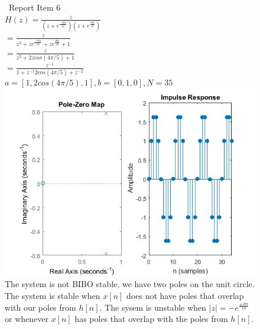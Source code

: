 \documentclass{article}
\begin{document}
\begin{figure}[H]
\ Report Item 6
\\ $H(z) = \frac{z}{{(z+e^{\frac{-i8\pi}{10}})(z+e^{\frac{i8\pi}{10}})}}$
\\ $ = \frac{z}{z^2 + ze^{\frac{-i8\pi}{10}} + ze^{\frac{i8\pi}{10}} + 1}$
\\ $ = \frac{z}{z^2+2zcos(4\pi/5) + 1}$
\\ $ = \frac{z^{-1}}{1 + z^{-1}2cos(4\pi/5) + z^{-2}}$
\\ $ a = [1,2cos(4\pi/5),1], b = [0,1,0], N = 35$
\includegraphics[scale = .5]{report6}
\\ The system is not BIBO stable, we have two poles on the unit circle.  The system is stable when $x[n]$ does not have poles that overlap with our poles from $h[n]$. The sysem is unstable when $|z| =  - e^{\frac{\pm i8\pi}{10}}$ or whenever $x[n]$ has poles that overlap with the poles from $h[n]$.
\end{figure}



\break
\end{document}
